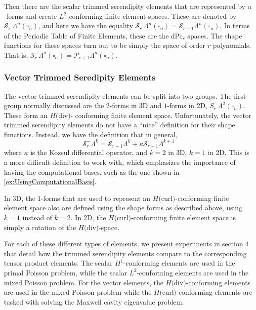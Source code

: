 \documentclass[manuscript,screen]{acmart}
\newcommand{\calP}{\mathcal{P}}
\newcommand{\calS}{\mathcal{S}}
\newcommand{\hcurl}{$H($curl$)$}
\newcommand{\hdiv}{$H($div$)$}
\begin{document}
  Then there are the scalar trimmed serendipity elements that are represented by $n$-forms and create $L^2$-conforming finite element spaces.  These are denoted by $\calS_r^-\Lambda^n(\square_n)$, and here we have the equality $\calS_r^-\Lambda^n(\square_n) = \calS_{r+1}\Lambda^n(\square_n)$.  In terms of the Periodic Table of Finite Elements, these are the dPc$_r$ spaces.  The shape functions for these spaces turn out to be simply the space of order $r$ polynomials.  That is, $\calS_r^-\Lambda^n(\square_n) = \calP_{r+1}\Lambda^n(\square_n)$.
  
  \subsubsection{Vector Trimmed Seredipity Elements}
  
  The vector trimmed serendipity elements can be split into two groups.  The first group normally discussed are the $2$-forms in 3D and $1$-forms in 2D, $S_r^-\Lambda^2(\square_n)$.  These form an \hdiv- conforming finite element space.  Unfortunately, the vector trimmed serendipity elements do not have a ``nice'' definition for their shape functions.  Instead, we have the definition that in general, 
  \begin{equation*}
      \calS_r^-\Lambda^k = \calS_{r-1}\Lambda^k + \kappa \calS_{r-1}\Lambda^{k+1}
  \end{equation*}
  where $\kappa$ is the Kozsul differential operator, and $k=2$ in 3D, $k=1$ in 2D.  This is a more difficult definition to work with, which emphasizes the importance of having the computational bases, such as the one shown in \ref{ex:UsingComputationalBasis}.  
  
  In 3D, the $1$-forms that are used to represent an \hcurl-conforming finite element space also are defined using the shape forms as described above, using $k=1$ instead of $k=2$.  In 2D, the \hcurl-conforming finite element space is simply a rotation of the \hdiv-space.  
  
  For each of these different types of elements, we present experiments in section 4 that detail how the trimmed serendipity elements compare to the corresponding tensor product elements.  The scalar $H^1$-conforming elements are used in the primal Poisson problem, while the scalar $L^2$-conforming elements are used in the mixed Poisson problem.  For the vector elements, the \hdiv-conforming elements are used in the mixed Poisson problem while the \hcurl-conforming elements are tasked with solving the Maxwell cavity eigenvalue problem.
  
\end{document}
